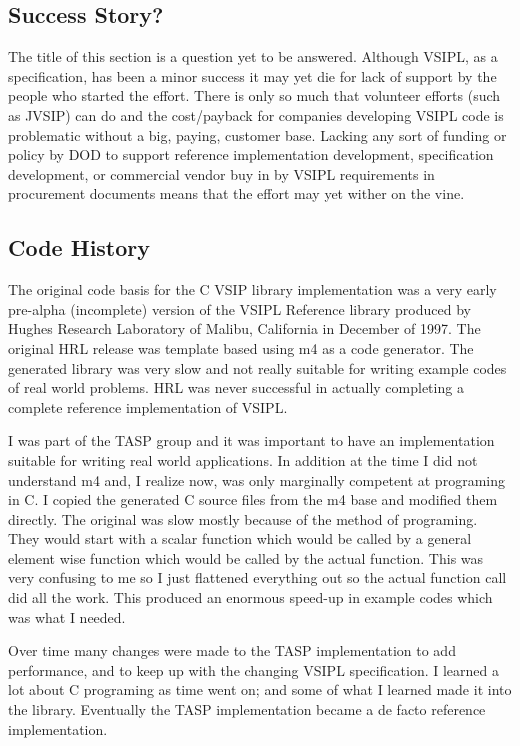 \subsection*{Success Story?}
The title of this section is a question yet to be answered. Although VSIPL, as a specification, has been a minor success it may yet die for lack of support by the people who started the effort. There is only so much that volunteer efforts (such as JVSIP) can do and the cost/payback for companies developing VSIPL code is problematic without a big, paying, customer base.  Lacking any sort of funding or policy by DOD to support reference implementation development, specification development, or commercial vendor buy in by VSIPL requirements in procurement documents means that the effort may yet wither on the vine. 
\subsection*{Code History}
The original code basis for the C VSIP library implementation was a very early pre-alpha (incomplete) version of the VSIPL Reference library produced by Hughes Research Laboratory of Malibu, California in December of 1997. The original HRL release was template based using m4 as a code generator. The generated library was very slow and not really suitable for writing example codes of real world problems.  HRL was never successful in actually completing a complete reference implementation of VSIPL.

I was part of the TASP group and it was important to have an implementation suitable for writing real world applications.  In addition at the time I did not understand m4 and, I realize now, was only marginally competent at programing in C. I copied the generated C source files from the m4 base and modified them directly. The original was slow mostly because of the method of programing. They would start with a scalar function which would be called by a general element wise function which would be called by the actual function. This was very confusing to me so I just flattened everything out so the actual function call did all the work. This produced an enormous speed-up in example codes which was what I needed.

Over time many changes were made to the TASP implementation to add performance, and to keep up with the changing VSIPL specification. I learned a lot about C programing as time went on; and some of what I learned made it into the library. Eventually the TASP implementation became a de facto reference implementation.


